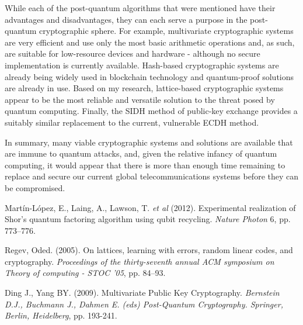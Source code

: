 \documentclass[journal]{IEEEtran}
\begin{document}
While each of the post-quantum algorithms that were mentioned have their advantages and disadvantages, they can each serve a purpose in the post-quantum cryptographic sphere. For example, multivariate cryptographic systems are very efficient and use only the most basic arithmetic operations and, as such, are suitable for low-resource devices and hardware - although no secure implementation is currently available. Hash-based cryptographic systems are already being widely used in blockchain technology and quantum-proof solutions are already in use. Based on my research, lattice-based cryptographic systems appear to be the most reliable and versatile solution to the threat posed by quantum computing. Finally, the SIDH method of public-key exchange provides a suitably similar replacement to the current, vulnerable ECDH method.

In summary, many viable cryptographic systems and solutions are available that are immune to quantum attacks, and, given the relative infancy of quantum computing, it would appear that there is more than enough time remaining to replace and secure our current global telecommunications systems before they can be compromised.

\begin{thebibliography}{1}

 Martín-López, E., Laing, A., Lawson, T. \emph{et al} (2012). Experimental realization of Shor's quantum factoring algorithm using qubit recycling. \emph{Nature Photon} 6, pp. 773–776.

 Regev, Oded. (2005). On lattices, learning with errors, random linear codes, and cryptography. \emph{Proceedings of the thirty-seventh annual ACM symposium on Theory of computing - STOC '05}, pp. 84–93.

 Ding J., Yang BY. (2009). Multivariate Public Key Cryptography. \emph{Bernstein D.J., Buchmann J., Dahmen E. (eds) Post-Quantum Cryptography. Springer, Berlin, Heidelberg}, pp. 193-241.

\end{thebibliography}
\end{document}
